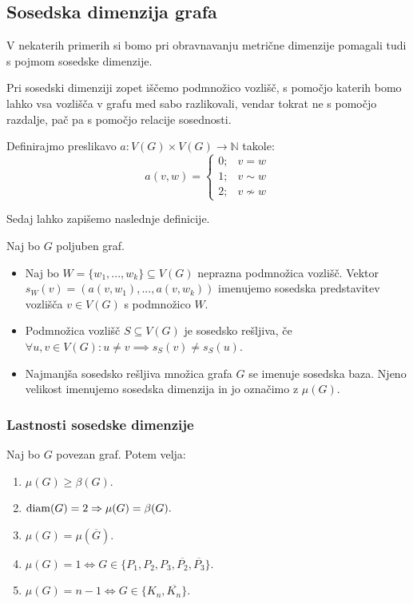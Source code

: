 \documentclass[mat1, tisk]{fmfdelo}
\newcommand{\1}{(1, 1, ..., 1)}
\newcommand{\2}{(2, 2, ..., 2)}
\begin{document}
\subsection{Sosedska dimenzija grafa}
V nekaterih primerih si bomo pri obravnavanju metrične dimenzije pomagali tudi s pojmom 
sosedske dimenzije. 

Pri sosedski dimenziji zopet iščemo podmnožico vozlišč, s pomočjo katerih bomo lahko vsa 
vozlišča v grafu med sabo razlikovali, vendar tokrat ne s pomočjo razdalje, pač pa s 
pomočjo relacije sosednosti. 

Definirajmo preslikavo  $a: V(G) \times V(G) \rightarrow \mathbb{N}$ takole:  
\begin{equation} \label{eq:fja_a} 
    a(v, w) = 
    \begin{cases}
        0; & v = w \\
        1; & v \sim w \\
        2; & v \not\sim w
    \end{cases} 
\end{equation} 

Sedaj lahko zapišemo naslednje definicije.

\begin{definicija}
    Naj bo $G$ poljuben graf. 
    \begin{itemize}
        \item Naj bo $W = \{ w_1, ... , w_k  \} \subseteq V(G)$ neprazna podmnožica vozlišč. 
        Vektor $s_W(v) = (a(v, w_1), ..., a(v, w_k))$ imenujemo 
        sosedska predstavitev vozlišča $v \in V(G)$ s podmnožico $W$.
        \item  Podmnožica vozlišč $S \subseteq V(G)$ je sosedsko rešljiva,
        če $\forall u, v \in V(G): u\neq v \implies s_S(v) \neq s_S(u)$.
        \item Najmanjša sosedsko rešljiva množica grafa $G$ se imenuje sosedska baza. 
        Njeno velikost imenujemo sosedska dimenzija in jo označimo z $\mu (G).$
    \end{itemize}    
\end{definicija}




\subsubsection{Lastnosti sosedske dimenzije}

\begin{trditev} Naj bo $G$ povezan graf. Potem velja:
    \begin{enumerate}
        \item $\mu(G) \geq \beta(G)$.
        \item ${\rm diam}(G) = 2 \Rightarrow \mu(G) = \beta(G).$
        \item $\mu(G) = \mu(\overline{G}).$
        \item $\mu(G) = 1 \Leftrightarrow G \in \{P_1, P_2, P_3, \overline{P_2}, \overline{P_3}\}.$
        \item $\mu(G) = n - 1 \Leftrightarrow G \in \{K_n, \overline{K_n}\}.$
    \end{enumerate}
\end{trditev}
\end{document}
